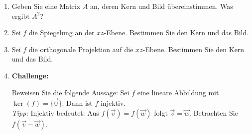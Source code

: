 \begin{ueb}
\begin{enumerate}
  \item Geben Sie eine Matrix \( A \) an, deren Kern und Bild übereinstimmen.  
  Was ergibt \( A^2 \)?

  \item Sei \( f \) die Spiegelung an der \( xz \)-Ebene.  
  Bestimmen Sie den Kern und das Bild.

  \item Sei \( f \) die orthogonale Projektion auf die \( xz \)-Ebene.  
  Bestimmen Sie den Kern und das Bild.

  \item \textbf{Challenge:}
  
    Beweisen Sie die folgende Aussage:  
    Sei \( f \) eine lineare Abbildung mit \( \ker(f) = \{ \vec{0} \} \).  
    Dann ist \( f \) injektiv.\\
    \emph{Tipp:} Injektiv bedeutet: Aus \( f(\vec{v}) = f(\vec{w}) \) folgt \( \vec{v} = \vec{w} \).  
    Betrachten Sie \( f(\vec{v} - \vec{w}) \).

\end{enumerate}

\end{ueb}

